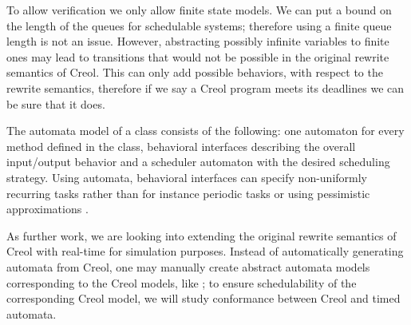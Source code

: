\documentclass[copyright,creativecommons]{eptcs}
\theoremstyle{definition}
\begin{document}
To allow verification we only allow finite state models. We can put a bound on the length of the queues for schedulable systems; therefore using a finite queue length is not an issue.
However, abstracting possibly infinite variables to finite ones may lead to transitions that would not be possible in the original rewrite semantics of Creol. This can only add possible behaviors, with respect to the rewrite semantics, therefore if we say a Creol program meets its deadlines we can be sure that it does.

The automata model of a class consists of the following: one automaton for every method defined in the class, behavioral interfaces describing the overall input/output behavior and a scheduler automaton with the desired scheduling strategy. Using automata, behavioral interfaces can specify non-uniformly recurring tasks rather than for instance periodic tasks or using pessimistic approximations \cite{FersmanYi07acc}.






As further work, we are  looking into extending the original rewrite semantics of Creol with real-time for simulation purposes.
Instead of automatically generating automata from Creol, one may manually create abstract automata models corresponding to the Creol models, like \cite{BoerGJSY09}; to ensure schedulability of the corresponding Creol model, we will study conformance between Creol and timed automata.





\end{document}
